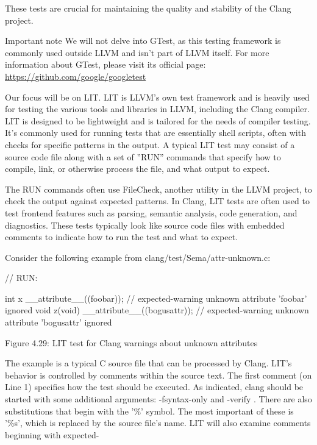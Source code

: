 These tests are crucial for maintaining the quality and stability of the Clang project.

\begin{myNotic}{Important note}
We will not delve into GTest, as this testing framework is commonly used outside LLVM and isn’t part of LLVM itself. For more information about GTest, please visit its official page: \url{https://github.com/google/googletest}
\end{myNotic}

Our focus will be on LIT. LIT is LLVM’s own test framework and is heavily used for testing the various tools and libraries in LLVM, including the Clang compiler. LIT is designed to be lightweight and is tailored for the needs of compiler testing. It’s commonly used for running tests that are essentially shell scripts, often with checks for specific patterns in the output. A typical LIT test may consist of a source code file along with a set of ”RUN” commands that specify how to compile, link, or otherwise process the file, and what output to expect.

The RUN commands often use FileCheck, another utility in the LLVM project, to check the output against expected patterns. In Clang, LIT tests are often used to test frontend features such as parsing, semantic analysis, code generation, and diagnostics. These tests typically look like source code files with embedded comments to indicate how to run the test and what to expect.

Consider the following example from clang/test/Sema/attr-unknown.c:

\begin{cpp}
// RUN: %

int x __attribute__((foobar)); // expected-warning {{unknown attribute ’foobar’ ignored}}
void z(void) __attribute__((bogusattr)); // expected-warning {{unknown attribute ’bogusattr’ ignored}}
\end{cpp}

\begin{center}
Figure 4.29: LIT test for Clang warnings about unknown attributes
\end{center}

The example is a typical C source file that can be processed by Clang. LIT’s behavior is controlled by comments within the source text. The first comment (on Line 1) specifies how the test should be executed. As indicated, clang should be started with some additional arguments: -fsyntax-only and -verify . There are also substitutions that begin with the ’\%’ symbol. The most important of these is ’\%s’, which is replaced by the source file’s name. LIT will also examine comments beginning with expected-

